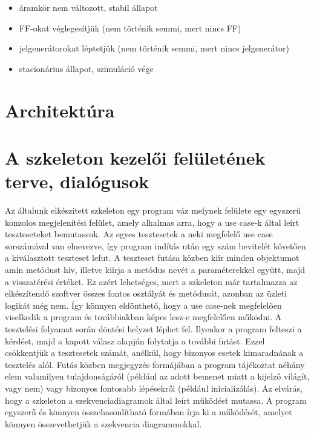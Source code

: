 {\begin{itemize}
\begin{itemize}
\begin{itemize}
	\item led változásának vizsgálata (\textbf{megkérdezi a tesztelőt}, javasolt: 0)
\end{itemize}
\item áramkör nem változott, stabil állapot
\item FF-okat véglegesítjük (nem történik semmi, mert nincs FF)
\item jelgenerátorokat léptetjük (nem történik semmi, mert nincs jelgenerátor)
\item stacionárius állapot, szimuláció vége
\end{itemize}
\end{itemize}
\vspace{-15pt}}

\section{Architektúra}

\section{A szkeleton kezelői felületének terve, dialógusok}
Az általunk elkészített szkeleton egy program váz melynek felülete egy egyszerű konzolos megjelenítési felület, amely alkalmas arra, hogy a use case-k által leírt teszteseteket bemutassuk. Az egyes tesztesetek a neki megfelelő use case sorszámával van elnevezve, így program indítás után egy szám bevitelét követően a kiválasztott teszteset lefut. 
A teszteset futása közben kiír minden objektumot amin metódust hív, illetve kiírja a metódus nevét a paraméterekkel együtt, majd a visszatérési értéket. Ez azért lehetséges, mert a szkeleton már tartalmazza az elkészítendő szoftver összes fontos osztályát és metódusát, azonban az üzleti logikát még nem. Így könnyen eldönthető, hogy a use case-nek megfelelően viselkedik a program és továbbiakban képes lesz-e megfelelően működni.
A tesztelési folyamat során döntési helyzet léphet fel. Ilyenkor a program felteszi a kérdést, majd a kapott válasz alapján folytatja a további futást. Ezzel csökkentjük a tesztesetek számát, anélkül, hogy bizonyos esetek kimaradnának a tesztelés alól. 
Futás közben megjegyzés formájában a program tájékoztat néhány elem valamilyen tulajdonságáról (például az adott bemenet miatt a kijelző világít, vagy nem) vagy bizonyos fontosabb lépésekről (például inicializálás).
Az elvárás, hogy a szkeleton a szekvenciadiagramok által leírt működést mutassa. A program egyszerű és könnyen összehasonlítható formában írja ki a működését, amelyet könnyen összevethetjük a szekvencia diagrammokkal.


